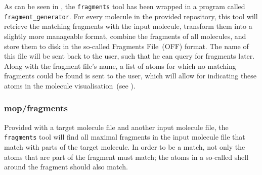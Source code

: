 As can be seen in , the \verb|fragments| tool has been wrapped in a program called \verb|fragment_generator|. For every molecule in the provided repository, this tool will retrieve the matching fragments with the input molecule, transform them into a slightly more manageable format, combine the fragments of all molecules, and store them to disk in the so-called \omfraf{} Fragments File~(OFF) format. The name of this file will be sent back to the \oframp{} user, such that he can query for fragments later. Along with the fragment file's name, a list of atoms for which no matching fragments could be found is sent to the user, which will allow for indicating these atoms in the molecule visualisation~(see ).

\subsubsection{mop/fragments}
Provided with a target molecule file and another input molecule file, the \verb|fragments| tool will find all maximal fragments in the input molecule file that match with parts of the target molecule. In order to be a match, not only the atoms that are part of the fragment must match; the atoms in a so-called shell around the fragment should also match.

